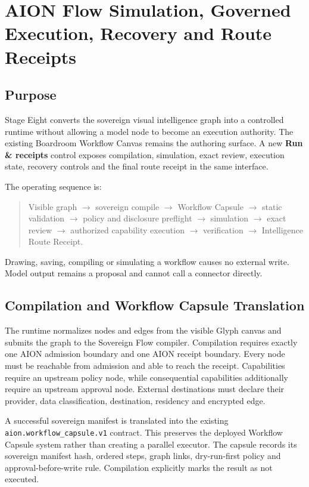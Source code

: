 \section{AION Flow Simulation, Governed Execution, Recovery and Route Receipts}
\label{sec:aion-flow-stage-eight}

\subsection{Purpose}

Stage Eight converts the sovereign visual intelligence graph into a controlled runtime
without allowing a model node to become an execution authority.  The existing Boardroom Workflow
Canvas remains the authoring surface.  A new \textbf{Run \& receipts} control exposes compilation,
simulation, exact review, execution state, recovery controls and the final route receipt in the same
interface.

The operating sequence is:

\begin{quote}
Visible graph $\rightarrow$ sovereign compile $\rightarrow$ Workflow Capsule $\rightarrow$
static validation $\rightarrow$ policy and disclosure preflight $\rightarrow$ simulation
$\rightarrow$ exact review $\rightarrow$ authorized capability execution $\rightarrow$
verification $\rightarrow$ Intelligence Route Receipt.
\end{quote}

Drawing, saving, compiling or simulating a workflow causes no external write.  Model output remains
a proposal and cannot call a connector directly.

\subsection{Compilation and Workflow Capsule Translation}

The runtime normalizes nodes and edges from the visible Glyph canvas and submits the graph to the
Sovereign Flow compiler.  Compilation requires exactly one AION admission boundary and one AION
receipt boundary.  Every node must be reachable from admission and able to reach the receipt.
Capabilities require an upstream policy node, while consequential capabilities additionally require
an upstream approval node.  External destinations must declare their provider, data classification,
destination, residency and encrypted edge.

A successful sovereign manifest is translated into the existing
\texttt{aion.workflow\_capsule.v1} contract.  This preserves the deployed Workflow Capsule system
rather than creating a parallel executor.  The capsule records its sovereign manifest hash, ordered
steps, graph links, dry-run-first policy and approval-before-write rule.  Compilation explicitly marks
the result as not executed.

